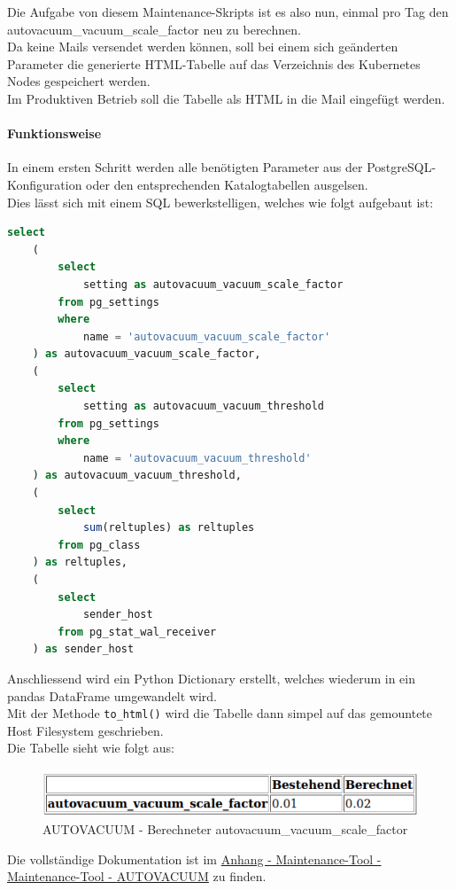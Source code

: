 \begin{flushleft}
    Die Aufgabe von diesem Maintenance-Skripts ist es also nun, einmal pro Tag den autovacuum\_vacuum\_scale\_factor neu zu berechnen.\\
    Da keine Mails versendet werden können, soll bei einem sich geänderten Parameter die generierte HTML-Tabelle auf das Verzeichnis des \Gls{Kubernetes} Nodes gespeichert werden.\\
    Im Produktiven Betrieb soll die Tabelle als HTML in die Mail eingefügt werden.
    \paragraph{Funktionsweise}
    In einem ersten Schritt werden alle benötigten Parameter aus der \Gls{PostgreSQL}-Konfiguration oder den entsprechenden Katalogtabellen ausgelsen.\\
    Dies lässt sich mit einem SQL bewerkstelligen, welches wie folgt aufgebaut ist:
    \lstset{style=gra_codestyle}
    \begin{lstlisting}[language=sql, caption=Maintenance-Tool - Parameter - Maintenance-Tool - AUTOVACUUM,captionpos=b,label={lst:maintenannce-tool-parameter-maintenance-tool-autovacuum},breaklines=true]
select
    (
        select
            setting as autovacuum_vacuum_scale_factor
        from pg_settings
        where
            name = 'autovacuum_vacuum_scale_factor'
    ) as autovacuum_vacuum_scale_factor,
    (
        select
            setting as autovacuum_vacuum_threshold
        from pg_settings
        where
            name = 'autovacuum_vacuum_threshold'
    ) as autovacuum_vacuum_threshold,
    (
        select
            sum(reltuples) as reltuples
        from pg_class
    ) as reltuples,
    (
        select
            sender_host
        from pg_stat_wal_receiver
    ) as sender_host
    \end{lstlisting}
\end{flushleft}
\begin{flushleft}
    Anschliessend wird ein Python Dictionary erstellt, welches wiederum in ein pandas DataFrame umgewandelt wird.\\
    Mit der Methode \texttt{to\_html()} wird die Tabelle dann simpel auf das gemountete Host Filesystem geschrieben.\\
    Die Tabelle sieht wie folgt aus:
    \begin{figure}[H]
        \centering
        \includegraphics[width=1\linewidth]{source/implementation/construction_implementation/maintenance_tool_autovacuum/autovacuum_result_html_table}
        \caption{\Gls{AUTOVACUUM} - Berechneter autovacuum\_vacuum\_scale\_factor}
        \label{fig:autovacuum_result_html_table}
    \end{figure}
\end{flushleft}
\begin{flushleft}
    Die vollständige Dokumentation ist im \hyperref[subsec:maintenance_autovacuum]{Anhang - Maintenance-Tool - Maintenance-Tool - \Gls{AUTOVACUUM}} zu finden.
\end{flushleft}